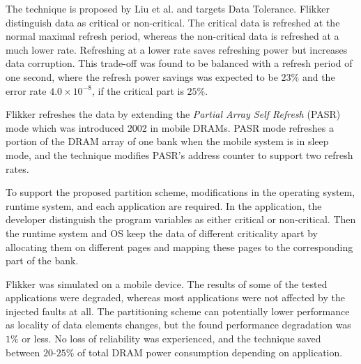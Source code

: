 The technique is proposed by Liu et al. \cite{flikker} and targets Data Tolerance. Flikker distinguish data as critical or non-critical. The critical data is refreshed at the normal maximal refresh period, whereas the non-critical data is refreshed at a much lower rate. Refreshing at a lower rate saves refreshing power but increases data corruption. This trade-off was found to be balanced with a refresh period of one second, where the refresh power savings was expected to be $23\%$ and the error rate $4.0 \times 10^{-8}$, if the critical part is $25\%$.

Flikker refreshes the data by extending the \textit{Partial Array Self Refresh} (PASR) mode which was introduced 2002 in mobile DRAMs. PASR mode refreshes a portion of the DRAM array of one bank when the mobile system is in sleep mode, and the technique modifies PASR's address counter to support two refresh rates.

To support the proposed partition scheme, modifications in the operating system, runtime system, and each application are required. In the application, the developer distinguish the program variables as either critical or non-critical. Then the runtime system and OS keep the data of different criticality apart by allocating them on different pages and mapping these pages to the corresponding part of the bank.


Flikker was simulated on a mobile device. The results of some of the tested applications were degraded, whereas most applications were not affected by the injected faults at all. The partitioning scheme can potentially lower performance as locality of data elements changes, but the found performance degradation was $1\%$ or less. No loss of reliability was experienced, and the technique saved between $20$-$25\%$ of total DRAM power consumption depending on application.